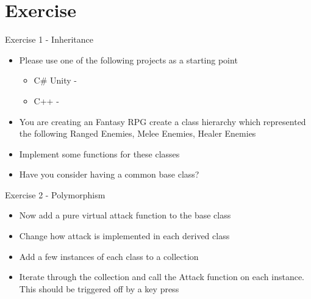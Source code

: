 \part{Exercise}
\frame{\partpage}

\begin{frame}{Exercise 1 - Inheritance}
	\begin{itemize}
		\item Please use one of the following projects as a starting point
		\begin{itemize}
			\item C\# Unity -
			\item C++ - 
		\end{itemize}
		\item You are creating an Fantasy RPG create a class hierarchy which represented the following Ranged Enemies, Melee Enemies, Healer Enemies
		\item Implement some functions for these classes
		\item Have you consider having a common base class?
	\end{itemize}
\end{frame}

\begin{frame}{Exercise 2 - Polymorphism}
	\begin{itemize}
		\item Now add a pure virtual attack function to the base class
		\item Change how attack is implemented in each derived class
		\item Add a few instances of each class to a collection
		\item Iterate through the collection and call the Attack function on each instance. This should be triggered off by a key press
	\end{itemize}
\end{frame}